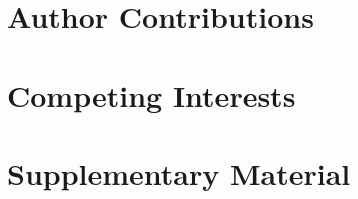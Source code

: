 \documentclass[12pt, a4paper]{article}
\begin{document}
\section{Author Contributions}\label{InterPath-Author-Contributions}

\section{Competing Interests}\label{InterPath-Competing-Interests}

\begingroup

%
\endgroup

\clearpage
\section{Supplementary Material}

\captionsetup[figure]{name=Supplementary Figure}
\captionsetup[table]{name=Supplementary Table}


\begingroup

%
\endgroup


\iffalse

\fi
\end{document}
